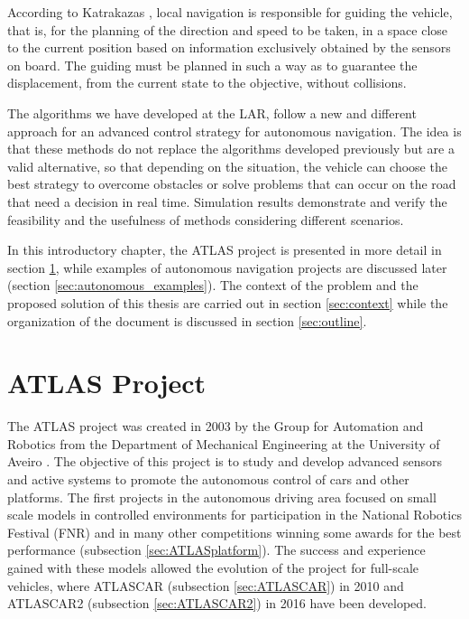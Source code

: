 According to Katrakazas \cite{Katrakazas2015}, local navigation is responsible for guiding the vehicle, that is, for the planning of the direction and speed to be taken, in a space close to the current position based on information exclusively obtained by the sensors on board. The guiding must be planned in such a way as to guarantee the displacement, from the current state to the objective, without collisions.

The algorithms we have developed at the LAR, follow a new and different approach for an advanced control strategy for autonomous navigation. The idea is that these methods do not replace the algorithms developed previously but are a valid alternative, so that depending on the situation, the vehicle can choose the best strategy to overcome obstacles or solve problems that can occur on the road that need a decision in real time.  Simulation results demonstrate and verify the feasibility and the usefulness of methods considering different scenarios.

In this introductory chapter, the ATLAS project is presented in more detail in section \ref{sec:ATLAS}, while examples of autonomous navigation projects are discussed later (section \ref{sec:autonomous_examples}). The context of the problem and the proposed solution of this thesis are carried out in section \ref{sec:context} while the organization of the document is discussed in section \ref{sec:outline}.
\section{ATLAS Project}\label{sec:ATLAS}
The ATLAS project was created in 2003 by the Group for Automation and Robotics from the Department of Mechanical Engineering at the University of Aveiro \cite{vsantos2010}. The objective of this project is to study and develop advanced sensors and active systems to promote the autonomous control of cars and other platforms. The first projects in the autonomous driving area focused on small scale models in controlled environments for participation in the National Robotics Festival (FNR) and in many other competitions winning some awards for the best performance (subsection \ref{sec:ATLASplatform}). The success and experience gained with these models allowed the evolution of the project for full-scale vehicles, where ATLASCAR (subsection \ref{sec:ATLASCAR}) in 2010 and ATLASCAR2 (subsection \ref{sec:ATLASCAR2}) in 2016 have been developed.

